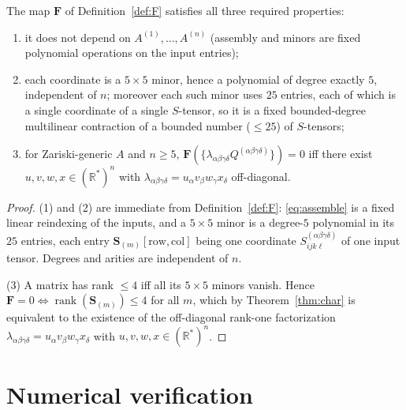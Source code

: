 \begin{theorem}\label{thm:main}
The map $\mathbf F$ of Definition~\ref{def:F} satisfies all three required properties:
\begin{enumerate}
\item it does not depend on $A^{(1)},\dots,A^{(n)}$ (assembly and minors are fixed
polynomial operations on the input entries);
\item each coordinate is a $5\times5$ minor, hence a polynomial of degree exactly $5$,
independent of $n$; moreover each such minor uses $25$ entries, each of which is a single
coordinate of a single $S$-tensor, so it is a fixed bounded-degree multilinear
contraction of a bounded number ($\le25$) of $S$-tensors;
\item for Zariski-generic $A$ and $n\ge5$,
$\mathbf F(\{\lambda_{\alpha\beta\gamma\delta}Q^{(\alpha\beta\gamma\delta)}\})=0$ iff
there exist $u,v,w,x\in(\mathbb R^*)^n$ with
$\lambda_{\alpha\beta\gamma\delta}=u_\alpha v_\beta w_\gamma x_\delta$ off-diagonal.
\end{enumerate}
\end{theorem}

\begin{proof}
(1) and (2) are immediate from Definition~\ref{def:F}: \eqref{eq:assemble} is a fixed
linear reindexing of the inputs, and a $5\times5$ minor is a degree-$5$ polynomial in
its $25$ entries, each entry $\mathbf S_{(m)}[\text{row},\text{col}]$ being one
coordinate $S^{(\alpha\beta\gamma\delta)}_{ijk\ell}$ of one input tensor. Degrees and
arities are independent of $n$.

(3) A matrix has rank $\le4$ iff all its $5\times5$ minors vanish. Hence $\mathbf F=0
\iff\operatorname{rank}(\mathbf S_{(m)})\le4$ for all $m$, which by
Theorem~\ref{thm:char} is equivalent to the existence of the off-diagonal rank-one
factorization $\lambda_{\alpha\beta\gamma\delta}=u_\alpha v_\beta w_\gamma x_\delta$ with
$u,v,w,x\in(\mathbb R^*)^n$.
\end{proof}

\appendix
\section{Numerical verification}

